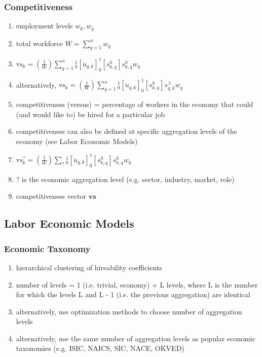 \documentclass{elsarticle} %
\begin{document}
\subsubsection{Competitiveness}
\begin{enumerate}
    \item employment levels $w_k, w_q$
    \item total workforce $W = \sum_{q=1}^{n}{w_q}$
    \item $\text{vs}_k = \left(\frac{1}{W}\right) \sum_{q=1}^{n}{_{0}^{1}[\ddot{u}_{q,k}] _{0}^{1}[s_{k,q}^{h}] s_{k,q}^{h} w_q}$
    \item alternatively, $\text{vs}_k = \left(\frac{1}{W}\right)
              \sum_{q=1}^{n}{_{0}^{1}[\ddot{u}_{q,k}] _{0}^{1}[s_{k,q}^{h}] s_{q,k}^{\geq}
              w_q}$
    \item competitiveness (versus) = percentage of workers in the economy that could (and
          would like to) be hired for a particular job
    \item competitiveness can also be defined at specific aggregation levels of the
          economy (see Labor Economic Models)
    \item $\text{vs}_{k}^{?} = \left(\frac{1}{W}\right) \sum_{?}{_{0}^{1}[\ddot{u}_{q,k}] _{0}^{1}[s_{k,q}^{h}] s_{k,q}^{h} w_q}$
    \item ? is the economic aggregation level (e.g. sector, industry, market, role)
    \item competitiveness vector $\textbf{vs}$
\end{enumerate}

\subsection{Labor Economic Models}
\subsubsection{Economic Taxonomy}
\begin{enumerate}
    \item hierarchical clustering of hireability coefficients
    \item number of levels = 1 (i.e. trivial, economy) + L levels, where L is the number
          for which the levels L and L - 1 (i.e. the previous aggregation) are identical
    \item alternatively, use optimization methods to choose number of aggregation levels
    \item alternatively, use the same number of aggregation levels as popular economic
          taxonomies (e.g. ISIC, NAICS, SIC, NACE, OKVED)
\end{enumerate}
\end{document}
